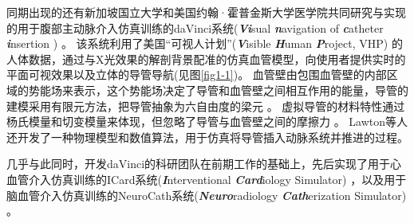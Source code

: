同期出现的还有新加坡国立大学和美国约翰·霍普金斯大学医学院共同研究与实现的用于腹部主动脉介入仿真训练的daVinci系统(\textbf{\textit{Vi}}sual \textbf{\textit{n}}avigation of \textbf{\textit{c}}atheter \textbf{\textit{i}}nsertion \cite{Lawton2000daVinci}) \cite{Anderson1996daVinci,Anderson1996adaVinci,Anderson1997daVinci,Anderson1997adaVinci}。%
该系统利用了美国“可视人计划”(\textbf{\textit{V}}isible \textbf{\textit{H}}uman \textbf{\textit{P}}roject, VHP) \cite{vhpweb}的人体数据，通过与X光效果的解剖背景配准的仿真血管模型，向使用者提供实时的平面可视效果以及立体的导管导航\cite{Anderson1998daVinci}(见图\ref{fig1-1})。%
血管壁由包围血管壁的内部区域的势能场来表示，这个势能场决定了导管和血管壁之间相互作用的能量，导管的建模采用有限元方法，把导管抽象为六自由度的梁元 \cite{Chui1996daVinci,Wang1996daVinci}。%
虚拟导管的材料特性通过杨氏模量和切变模量来体现，但忽略了导管与血管壁之间的摩擦力 \cite{Anderson1998daVinci}。
Lawton等人 \cite{Lawton2000daVinci}还开发了一种物理模型和数值算法，用于仿真将导管插入动脉系统并推进的过程。


几乎与此同时，开发daVinci的科研团队在前期工作的基础上，先后实现了用于心血管介入仿真训练的ICard系统(\textbf{\textit{I}}nterventional \textbf{\textit{Card}}iology Simulator) \cite{Wang1997ICard,Chui1998ICard,Wang1998ICard,Cai2004ICard,Cai2006ICard}，以及用于脑血管介入仿真训练的NeuroCath系统(\textbf{\textit{Neuro}}radiology \textbf{\textit{Cath}}erization Simulator) \cite{Ma2000NeuroCath,Nowinski2000NeuroCath,Ma2001NeuroCath,Li2001NeuroCath,Nowinski2001NeuroCath,Anderson2001NeuroCath,Chui2002NeuroCath,Anderson2002NeuroCath,Ma2004NeuroCath,Volkau2005Vessel,Ma2005NeuroCath,Ma2006NeuroCath,Ma2006aNeuroCath,Ma2007NeuroCath}。%

